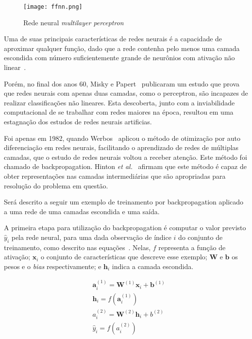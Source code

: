 \begin{figure}
\begin{center} {
    \begin{center}
    \texttt{[image: ffnn.png]}
    \caption{Rede neural \textit{multilayer perceptron}}
    \label{fig:ff-neural-net}
    \end{center}
}
\end{center}
\end{figure}

Uma de suas principais características de redes neurais é a capacidade de aproximar qualquer função, dado que a rede
contenha pelo menos uma camada escondida com número suficientemente grande de neurônios com ativação não
linear~\cite{hornik89}.

Porém, no final dos anos 60, Misky e Papert~\cite{minsky72} publicaram um estudo que prova que redes neurais com
apenas duas camadas, como o perceptron, são incapazes de realizar classificações não lineares.
Esta descoberta, junto com a inviabilidade computacional de se trabalhar com redes maiores na época, resultou em uma
estagnação dos estudos de redes neurais artificias.

Foi apenas em 1982, quando Werbos~\cite{werbos82} aplicou o método de otimização por auto diferenciação em redes neurais,
facilitando o aprendizado de redes de múltiplas camadas, que o estudo de redes neurais voltou a receber atenção.
Este método foi chamado de backpropagation.
Hinton \textit{et al.}~\cite{williams86} afirmam que este método é capaz de obter representações nas camadas
intermediárias que são apropriadas para resolução do problema em questão.

Será descrito a seguir um exemplo de treinamento por backpropagation aplicado a uma rede de uma camadas escondida e uma
saída.

A primeira etapa para utilização do backpropagation é computar o valor previsto ${\hat{y}_i}$ pela rede neural, para
uma dada observação de índice $i$ do conjunto de treinamento, como descrito nas
equações~.
Nelas, $f$ representa a função de ativação; $\mathbf{x}_i$ o conjunto de características que descreve esse exemplo;
$\mathbf{W}$ e $\mathbf{b}$ os pesos e o \textit{bias} respectivamente; e $\mathbf{h}_i$ indica a camada escondida.

\begin{subequations} \label{eq:nn-forward}
\begin{align}
    &\mathbf{a}_i^{(1)} = \mathbf{W}^{(1)} \mathbf{x}_i + \mathbf{b}^{(1)} \label{eq:nn-forward-a1}\\
    &\mathbf{h}_i = f(\mathbf{a}_i^{(1)}) \label{eq:nn-forward-hidden}\\
    &a_i^{(2)} = \mathbf{W}^{(2)} \mathbf{h}_i + b^{(2)} \label{eq:nn-forward-a2}\\
    &\hat{y}_i = f(a_i^{(2)}) \label{eq:nn-forward-y}
\end{align}
\end{subequations}


